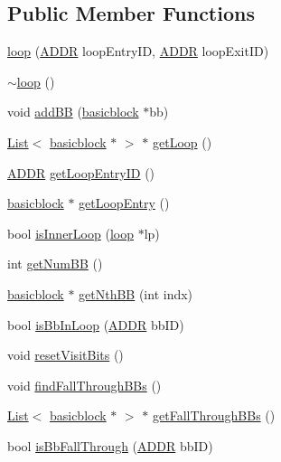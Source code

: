 \subsection*{Public Member Functions}
\begin{DoxyCompactItemize}
\item 
\hyperlink{classloop_a56aab74b3345d5731cd1243e2a41bc76}{loop} (\hyperlink{binaryTranslator_2global_8h_aa4557b0650cb21e57e3e4623410832c6}{ADDR} loopEntryID, \hyperlink{binaryTranslator_2global_8h_aa4557b0650cb21e57e3e4623410832c6}{ADDR} loopExitID)
\item 
\hyperlink{classloop_aad652628bd3d921231b869db97e528ad}{$\sim$loop} ()
\item 
void \hyperlink{classloop_aa9324a68eb1fc3b86eabff7815132443}{addBB} (\hyperlink{classbasicblock}{basicblock} $\ast$bb)
\item 
\hyperlink{classList}{List}$<$ \hyperlink{classbasicblock}{basicblock} $\ast$ $>$ $\ast$ \hyperlink{classloop_af5ef5dd07e6d5b52f318320cc7d6b037}{getLoop} ()
\item 
\hyperlink{binaryTranslator_2global_8h_aa4557b0650cb21e57e3e4623410832c6}{ADDR} \hyperlink{classloop_a6abf8e7d6763e76673f8287fe15785d4}{getLoopEntryID} ()
\item 
\hyperlink{classbasicblock}{basicblock} $\ast$ \hyperlink{classloop_a30c7019f2202671a81d8a33f9a33593e}{getLoopEntry} ()
\item 
bool \hyperlink{classloop_a6a34ac2a05496bd2192638280e42c316}{isInnerLoop} (\hyperlink{classloop}{loop} $\ast$lp)
\item 
int \hyperlink{classloop_a81113f34513c9e9ae41886ea150cbd3d}{getNumBB} ()
\item 
\hyperlink{classbasicblock}{basicblock} $\ast$ \hyperlink{classloop_a69d626e1bbfa64a45f3ddf805998967a}{getNthBB} (int indx)
\item 
bool \hyperlink{classloop_aff5df3cffef530a6e4f81ecd4deed86e}{isBbInLoop} (\hyperlink{binaryTranslator_2global_8h_aa4557b0650cb21e57e3e4623410832c6}{ADDR} bbID)
\item 
void \hyperlink{classloop_a49a50718778d9b23d51385a93aed10a8}{resetVisitBits} ()
\item 
void \hyperlink{classloop_a20ecb89d8b7cb21867fe53c6ad56f0f4}{findFallThroughBBs} ()
\item 
\hyperlink{classList}{List}$<$ \hyperlink{classbasicblock}{basicblock} $\ast$ $>$ $\ast$ \hyperlink{classloop_a6d90e411616771613671b11dd58d380d}{getFallThroughBBs} ()
\item 
bool \hyperlink{classloop_a550955b42ceff7c89445322abc564e28}{isBbFallThrough} (\hyperlink{binaryTranslator_2global_8h_aa4557b0650cb21e57e3e4623410832c6}{ADDR} bbID)
\end{DoxyCompactItemize}



